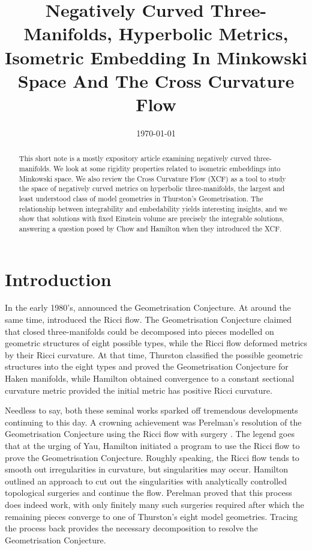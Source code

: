 \documentclass[a4paper,12pt]{amsart}
\begin{document}
\title[Negatively Curved Three Manifolds]{Negatively Curved Three-Manifolds, Hyperbolic Metrics, Isometric Embedding In Minkowski Space And The Cross Curvature Flow}

\date{\today}



\begin{abstract}
This short note is a mostly expository article examining negatively curved three-manifolds. We look at some rigidity properties related to isometric embeddings into Minkowski space. We also review the Cross Curvature Flow (XCF) as a tool to study the space of negatively curved metrics on hyperbolic three-manifolds, the largest and least understood class of model geometries in Thurston's Geometrisation. The relationship between integrability and embedability yields interesting insights, and we show that solutions with fixed Einstein volume are precisely the integrable solutions, answering a question posed by Chow and Hamilton when they introduced the XCF.
\end{abstract}

\maketitle

\section{Introduction}
\label{sec:intro}

In the early 1980's, \cite{MR648524} announced the Geometrisation Conjecture. At around the same time, \cite{Hamilton:/1982} introduced the Ricci flow. The Geometrisation Conjecture claimed that closed three-manifolds could be decomposed into pieces modelled on geometric structures of eight possible types, while the Ricci flow deformed metrics by their Ricci curvature. At that time, Thurston classified the possible geometric structures into the eight types and proved the Geometrisation Conjecture for Haken manifolds, while Hamilton obtained convergence to a constant sectional curvature metric provided the initial metric has positive Ricci curvature.

Needless to say, both these seminal works sparked off tremendous developments continuing to this day. A crowning achievement was Perelman's resolution of the Geometrisation Conjecture using the Ricci flow with surgery \cite{2003math......7245P,2003math......3109P,2002math.....11159P}. The legend goes that at the urging of Yau, Hamilton initiated a program to use the Ricci flow to prove the Geometrisation Conjecture. Roughly speaking, the Ricci flow  tends to smooth out irregularities in curvature, but singularities may occur. Hamilton outlined an approach to cut out the singularities with analytically controlled topological surgeries and continue the flow. Perelman proved that this process does indeed work, with only finitely many such surgeries required after which the remaining pieces converge to one of Thurston's eight model geometries. Tracing the process back provides the necessary decomposition to resolve the Geometrisation Conjecture.
\end{document}
